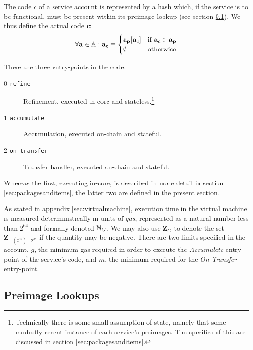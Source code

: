 The code $c$ of a service account is represented by a hash which, if the service is to be functional, must be present within its preimage lookup (see section \ref{sec:lookups}). We thus define the actual code $\mathbf{c}$:
\begin{align}
  \forall \mathbf{a} \in \mathbb{A} : \mathbf{a}_\mathbf{c} \equiv \begin{cases}
    \mathbf{a}_\mathbf{p}[\mathbf{a}_c] &\text{if } \mathbf{a}_c \in \mathbf{a}_\mathbf{p} \\
    \emptyset &\text{otherwise}
  \end{cases}
\end{align}

There are three entry-points in the code:
\begin{description}
  \item[0 \texttt{refine}]Refinement, executed in-core and stateless.\footnote{Technically there is some small assumption of state, namely that some modestly recent instance of each service's preimages. The specifics of this are discussed in section \ref{sec:packagesanditems}.}
  \item[1 \texttt{accumulate}] Accumulation, executed on-chain and stateful.
  \item[2 \texttt{on\_transfer}] Transfer handler, executed on-chain and stateful.
\end{description}

Whereas the first, executing in-core, is described in more detail in section \ref{sec:packagesanditems}, the latter two are defined in the present section.

As stated in appendix \ref{sec:virtualmachine}, execution time in the \Jam virtual machine is measured deterministically in units of \emph{gas}, represented as a natural number less than $2^{64}$ and formally denoted $\mathbb{N}_G$. We may also use $\mathbf{Z}_G$ to denote the set $\mathbf{Z}_{-(2^{32})\dots2^{32}}$ if the quantity may be negative. There are two limits specified in the account, $g$, the minimum gas required in order to execute the \emph{Accumulate} entry-point of the service's code, and $m$, the minimum required for the \emph{On Transfer} entry-point.










\subsection{Preimage Lookups}\label{sec:lookups}

